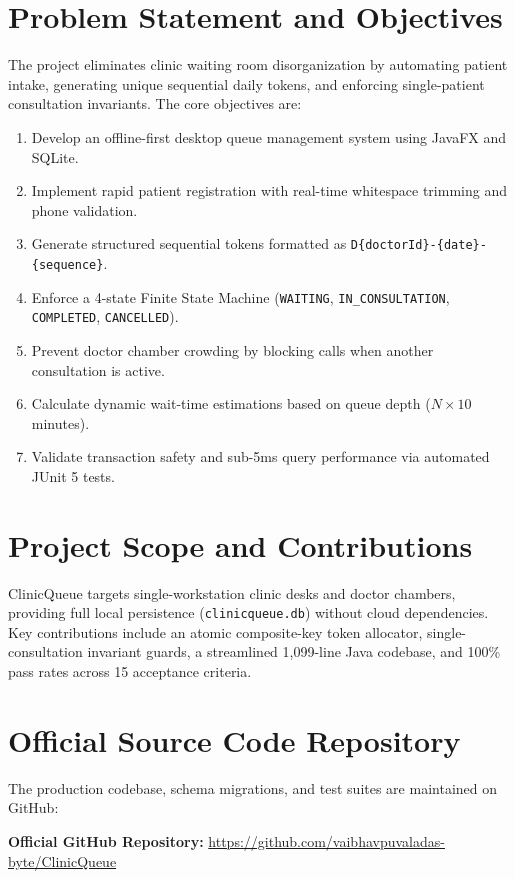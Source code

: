 \documentclass[12pt,a4paper,oneside]{report}
\begin{document}
\section{Problem Statement and Objectives}
The project eliminates clinic waiting room disorganization by automating patient intake, generating unique sequential daily tokens, and enforcing single-patient consultation invariants. The core objectives are:
\begin{enumerate}[leftmargin=0.7cm, itemsep=0.5pt]
    \item Develop an offline-first desktop queue management system using JavaFX and SQLite.
    \item Implement rapid patient registration with real-time whitespace trimming and phone validation.
    \item Generate structured sequential tokens formatted as \texttt{D\{doctorId\}-\{date\}-\{sequence\}}.
    \item Enforce a 4-state Finite State Machine (\texttt{WAITING}, \texttt{IN\_CONSULTATION}, \texttt{COMPLETED}, \texttt{CANCELLED}).
    \item Prevent doctor chamber crowding by blocking calls when another consultation is active.
    \item Calculate dynamic wait-time estimations based on queue depth ($N \times 10$ minutes).
    \item Validate transaction safety and sub-5ms query performance via automated JUnit 5 tests.
\end{enumerate}

\section{Project Scope and Contributions}
ClinicQueue targets single-workstation clinic desks and doctor chambers, providing full local persistence (\texttt{clinicqueue.db}) without cloud dependencies. Key contributions include an atomic composite-key token allocator, single-consultation invariant guards, a streamlined 1,099-line Java codebase, and 100\% pass rates across 15 acceptance criteria.

\section{Official Source Code Repository}
The production codebase, schema migrations, and test suites are maintained on GitHub:
\begin{center}
\textbf{Official GitHub Repository:} \url{https://github.com/vaibhavpuvaladas-byte/ClinicQueue}
\end{center}
\end{document}
